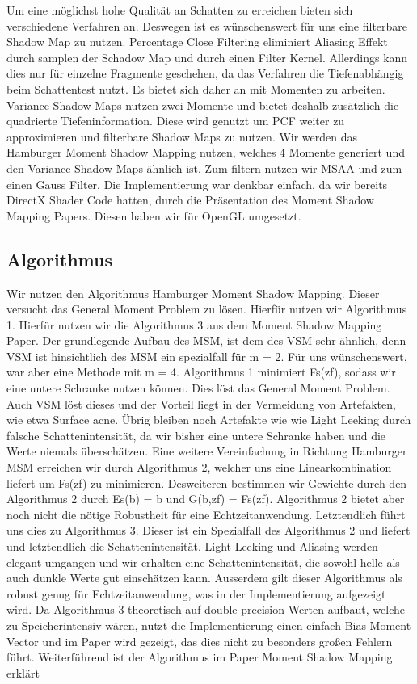 \documentclass[runningheaders,a4paper]{llncs}
\begin{document}
Um eine möglichst hohe Qualität an Schatten zu erreichen bieten sich verschiedene Verfahren an. Deswegen ist es wünschenswert für uns eine filterbare Shadow Map zu nutzen. Percentage Close Filtering eliminiert Aliasing Effekt durch samplen der Schadow Map und durch einen Filter Kernel.\cite{msm} 
Allerdings kann dies nur für einzelne Fragmente geschehen, da das Verfahren die Tiefenabhängig beim Schattentest nutzt.\cite{msm}
Es bietet sich daher an mit Momenten zu arbeiten. Variance Shadow Maps nutzen zwei Momente und bietet deshalb zusätzlich die quadrierte Tiefeninformation. Diese wird genutzt um PCF weiter zu approximieren und filterbare Shadow Maps zu nutzen.
Wir werden das Hamburger Moment Shadow Mapping nutzen, welches 4 Momente generiert und den Variance Shadow Maps ähnlich ist. Zum filtern nutzen wir MSAA und zum einen Gauss Filter. Die Implementierung war denkbar einfach, da wir bereits DirectX Shader Code hatten, durch die Präsentation des Moment Shadow Mapping Papers\cite{msm}. Diesen haben wir für OpenGL umgesetzt.

\subsection{Algorithmus}
Wir nutzen den Algorithmus Hamburger Moment Shadow Mapping. Dieser versucht das General Moment Problem\cite{msm} zu lösen. Hierfür nutzen wir Algorithmus 1. Hierfür nutzen wir die Algorithmus 3 aus dem Moment Shadow Mapping Paper. Der grundlegende Aufbau des MSM, ist dem des VSM sehr ähnlich, denn VSM ist hinsichtlich des MSM ein spezialfall für m = 2. Für uns wünschenswert, war aber eine Methode mit m = 4.
Algorithmus 1 minimiert Fs(zf), sodass wir eine untere Schranke nutzen können. Dies löst das General Moment Problem. Auch VSM löst dieses und der Vorteil liegt in der Vermeidung von Artefakten, wie etwa Surface acne. Übrig bleiben noch Artefakte wie wie Light Leeking durch falsche Schattenintensität, da wir bisher eine untere Schranke haben und die Werte niemals überschätzen. Eine weitere Vereinfachung in Richtung Hamburger MSM erreichen wir durch Algorithmus 2, welcher uns eine Linearkombination liefert um Fs(zf) zu minimieren. Desweiteren bestimmen wir Gewichte durch den Algorithmus 2 durch Es(b) = b und G(b,zf) = Fs(zf). Algorithmus 2 bietet aber noch nicht die nötige Robustheit für eine Echtzeitanwendung.\cite{msm}
Letztendlich führt uns dies zu Algorithmus 3. Dieser ist ein Spezialfall des Algorithmus 2 und liefert und letztendlich die Schattenintensität. Light Leeking und Aliasing werden elegant umgangen und wir erhalten eine Schattenintensität, die sowohl helle als auch dunkle Werte gut einschätzen kann. Ausserdem gilt dieser Algorithmus als robust genug für Echtzeitanwendung, was in der Implementierung aufgezeigt wird. Da Algorithmus 3 theoretisch auf double precision Werten aufbaut, welche zu Speicherintensiv wären, nutzt die Implementierung einen einfach Bias Moment Vector und im Paper wird gezeigt, das dies nicht zu besonders großen Fehlern führt. Weiterführend ist der Algorithmus im Paper Moment Shadow Mapping erklärt\cite{msm}
\end{document}
